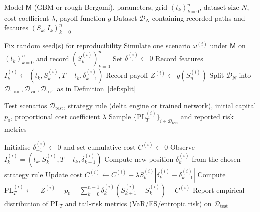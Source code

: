 \documentclass[12pt,a4paper]{article}
\theoremstyle{definition}
\theoremstyle{plain}
\theoremstyle{remark}
\theoremstyle{plain}
\begin{document}
\begin{algorithm}[H]
\caption{Scenario generation and dataset construction}
\label{alg:dataset_construction}
\begin{algorithmic}[1]
\Require Model $\mathsf{M}$ (GBM or rough Bergomi), parameters, grid $(t_k)_{k=0}^n$, dataset size $N$, cost coefficient $\lambda$, payoff function $g$
\Ensure Dataset $\mathcal{D}_N$ containing recorded paths and features $(S_k,I_k)_{k=0}^{n}$

\State Fix random seed(s) for reproducibility
    \State Simulate one scenario $\omega^{(i)}$ under $\mathsf{M}$ on $(t_k)_{k=0}^n$ and record $(S_k^{(i)})_{k=0}^n$
    \State Set $\delta_{-1}^{(i)}\gets 0$
        \State Record features $I_k^{(i)}\gets(t_k,S_k^{(i)},T-t_k,\delta_{k-1}^{(i)})$
    \EndFor
    \State Record payoff $Z^{(i)}\gets g(S_n^{(i)})$
\EndFor
\State Split $\mathcal{D}_N$ into $\mathcal{D}_{\mathrm{train}},\mathcal{D}_{\mathrm{val}},\mathcal{D}_{\mathrm{test}}$ as in Definition~\ref{def:split}
\end{algorithmic}
\end{algorithm}

\begin{algorithm}[H]
\caption{Out-of-sample hedging evaluation on a fixed test set}
\label{alg:hedging_evaluation}
\begin{algorithmic}[1]
\Require Test scenarios $\mathcal{D}_{\mathrm{test}}$, strategy rule (delta engine or trained network), initial capital $p_0$, proportional cost coefficient $\lambda$
\Ensure Sample $\{\mathrm{PL}_T^{(i)}\}_{i\in\mathcal{D}_{\mathrm{test}}}$ and reported risk metrics

    \State Initialise $\delta_{-1}^{(i)}\gets 0$ and set cumulative cost $C^{(i)}\gets 0$
        \State Observe $I_k^{(i)}=(t_k,S_k^{(i)},T-t_k,\delta_{k-1}^{(i)})$
        \State Compute new position $\delta_k^{(i)}$ from the chosen strategy rule
        \State Update cost $C^{(i)}\gets C^{(i)}+\lambda S_k^{(i)}|\delta_k^{(i)}-\delta_{k-1}^{(i)}|$
    \EndFor
    \State Compute $\mathrm{PL}_T^{(i)}\gets -Z^{(i)}+p_0+\sum_{k=0}^{n-1}\delta_k^{(i)}(S_{k+1}^{(i)}-S_k^{(i)})-C^{(i)}$
\EndFor
\State Report empirical distribution of $\mathrm{PL}_T$ and tail-risk metrics (VaR/ES/entropic risk) on $\mathcal{D}_{\mathrm{test}}$
\end{algorithmic}
\end{algorithm}
\end{document}
